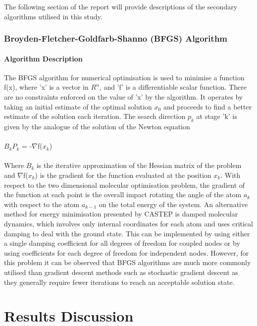 \documentclass[9pt]{article}
\begin{document}
The following section of the report will provide descriptions of the secondary algorithms utilised in this study.

\subsubsection{Broyden-Fletcher-Goldfarb-Shanno (BFGS) Algorithm}

\paragraph{Algorithm Description}

The BFGS algorithm for numerical optimisation is used to minimise a function f(x), where 'x' is a vector in $R^{n}$, and 'f' is a differentiable scalar function. There are no constraints enforced on the value of 'x' by the algorithm. It operates by taking an initial estimate of the optimal solution $x_{0}$ and proceeds to find a better estimate of the solution each iteration. The search direction $p_{k}$ at stage 'k' is given by the analogue of the solution of the Newton equation
\\ 
\\
$B_{k}$$P_{k}$ = -$\nabla$f($x_{k}$)
\\
\\
Where $B_{k}$ is the iterative approximation of the Hessian matrix of the problem and $\nabla$f($x_{k}$) is the gradient for the function evaluated at the position $x_{k}$. With respect to the two dimensional molecular optimisation problem, the gradient of the function at each point is the overall impact rotating the angle of the atom $a_{k}$ with respect to the atom $a_{k-1}$ on the total energy of the system. An alternative method for energy minimisation presented by CASTEP is damped molecular dynamics, which involves only internal coordinates for each atom and uses critical damping to deal with the ground state. This can be implemented by using either a single damping coefficient for all degrees of freedom for coupled nodes or by using coefficients for each degree of freedom for independent nodes. However, for this problem it can be observed that BFGS algorithms are much more commonly utilised than gradient descent methods such as stochastic gradient descent as they generally require fewer iterations to reach an acceptable solution state.

\section{Results Discussion}
\end{document}
